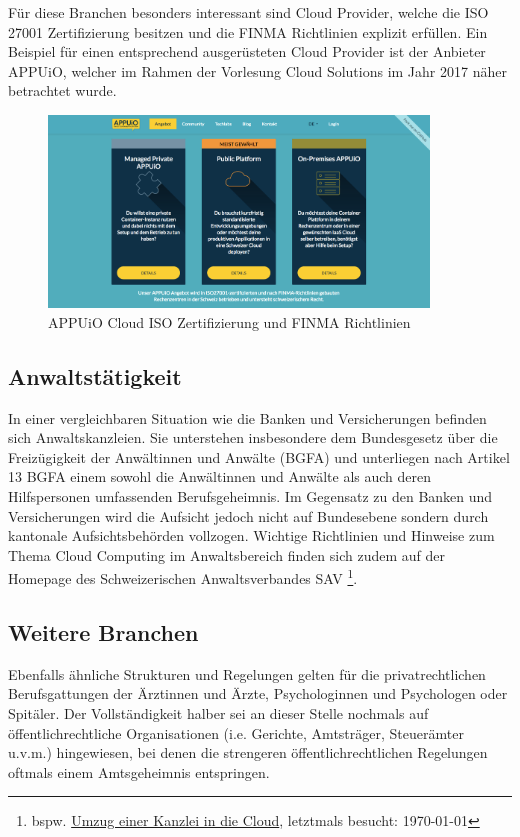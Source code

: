 \documentclass[a4paper,pointlessnumbers]{scrreprt}
\begin{document}
Für diese Branchen besonders interessant sind Cloud Provider, welche die ISO 27001 Zertifizierung besitzen und die FINMA Richtlinien explizit erfüllen. Ein Beispiel für einen entsprechend ausgerüsteten Cloud Provider ist der Anbieter APPUiO, welcher im Rahmen der Vorlesung Cloud Solutions im Jahr 2017 näher betrachtet wurde.

\begin{figure}[H]
\begin{center}
\includegraphics[width=0.9\textwidth]{images/appuio_iso.pdf}
\caption{APPUiO Cloud ISO Zertifizierung und FINMA Richtlinien}
\end{center}
\end{figure}

\subsection{Anwaltstätigkeit}
In einer vergleichbaren Situation wie die Banken und Versicherungen befinden sich Anwaltskanzleien. Sie unterstehen insbesondere dem Bundesgesetz über die Freizügigkeit der Anwältinnen und Anwälte (BGFA) und unterliegen nach Artikel 13 BGFA einem sowohl die Anwältinnen und Anwälte als auch deren Hilfspersonen umfassenden Berufsgeheimnis. Im Gegensatz zu den Banken und Versicherungen wird die Aufsicht jedoch nicht auf Bundesebene sondern durch kantonale Aufsichtsbehörden vollzogen. Wichtige Richtlinien und Hinweise zum Thema Cloud Computing im Anwaltsbereich finden sich zudem auf der Homepage des Schweizerischen Anwaltsverbandes SAV \footnote{bspw. \href{https://www.sav-fsa.ch/de/documents/dynamiccontent/03arv0515.pdf}{Umzug einer Kanzlei in die Cloud}, letztmals besucht: \today}.

\subsection{Weitere Branchen}
Ebenfalls ähnliche Strukturen und Regelungen gelten für die privatrechtlichen Berufsgattungen der Ärztinnen und Ärzte, Psychologinnen und Psychologen oder Spitäler. Der Vollständigkeit halber sei an dieser Stelle nochmals auf öffentlichrechtliche Organisationen (i.e. Gerichte, Amtsträger, Steuerämter u.v.m.) hingewiesen, bei denen die strengeren öffentlichrechtlichen Regelungen oftmals einem Amtsgeheimnis entspringen.
\end{document}
